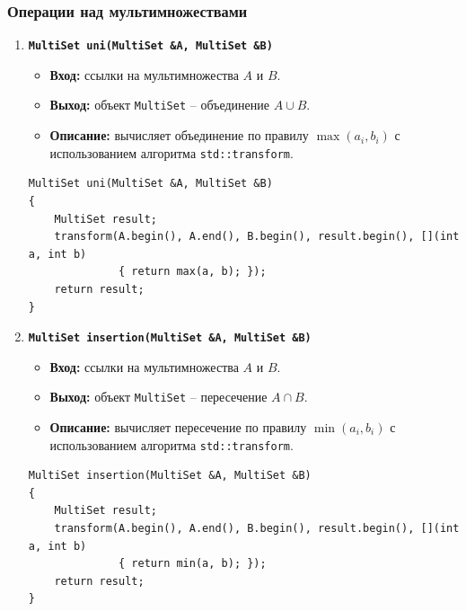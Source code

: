 \documentclass[14pt, a4paper]{extarticle}
\begin{document}
	\subsubsection*{Операции над мультимножествами}
	\begin{enumerate}[label=\arabic*., resume]
		\item \textbf{\texttt{MultiSet uni(MultiSet \&A, MultiSet \&B)}}
		\begin{itemize}[leftmargin=*, noitemsep]
			\item \textbf{Вход:} ссылки на мультимножества $A$ и $B$.
			\item \textbf{Выход:} объект \texttt{MultiSet} -- объединение $A \cup B$.
			\item \textbf{Описание:} вычисляет объединение по правилу $\max(a_i, b_i)$ с использованием алгоритма \texttt{std::transform}.
		\end{itemize}
		\begin{lstlisting}[caption={Функция uni()}, label={lst:func_uni}]
MultiSet uni(MultiSet &A, MultiSet &B)
{
    MultiSet result;
    transform(A.begin(), A.end(), B.begin(), result.begin(), [](int a, int b)
              { return max(a, b); });
    return result;
}
		\end{lstlisting}
		
		\item \textbf{\texttt{MultiSet insertion(MultiSet \&A, MultiSet \&B)}}
		\begin{itemize}[leftmargin=*, noitemsep]
			\item \textbf{Вход:} ссылки на мультимножества $A$ и $B$.
			\item \textbf{Выход:} объект \texttt{MultiSet} -- пересечение $A \cap B$.
			\item \textbf{Описание:} вычисляет пересечение по правилу $\min(a_i, b_i)$ с использованием алгоритма \texttt{std::transform}.
		\end{itemize}
		\begin{lstlisting}[caption={Функция insertion()}, label={lst:func_insertion}]
MultiSet insertion(MultiSet &A, MultiSet &B)
{
    MultiSet result;
    transform(A.begin(), A.end(), B.begin(), result.begin(), [](int a, int b)
              { return min(a, b); });
    return result;
}
		\end{lstlisting}
		

\end{enumerate}
\end{document}
